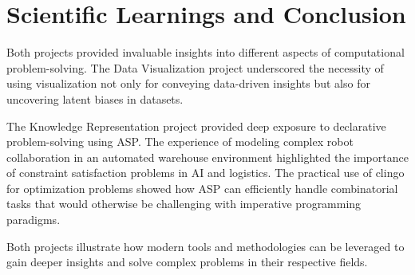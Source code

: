 \documentclass{IEEEtran}
\begin{document}
\section{Scientific Learnings and Conclusion}
Both projects provided invaluable insights into different aspects of computational problem-solving. The Data Visualization project underscored the necessity of using visualization not only for conveying data-driven insights but also for uncovering latent biases in datasets. 

The Knowledge Representation project provided deep exposure to declarative problem-solving using ASP. The experience of modeling complex robot collaboration in an automated warehouse environment highlighted the importance of constraint satisfaction problems in AI and logistics. The practical use of clingo for optimization problems showed how ASP can efficiently handle combinatorial tasks that would otherwise be challenging with imperative programming paradigms.

Both projects illustrate how modern tools and methodologies can be leveraged to gain deeper insights and solve complex problems in their respective fields.
\end{document}
